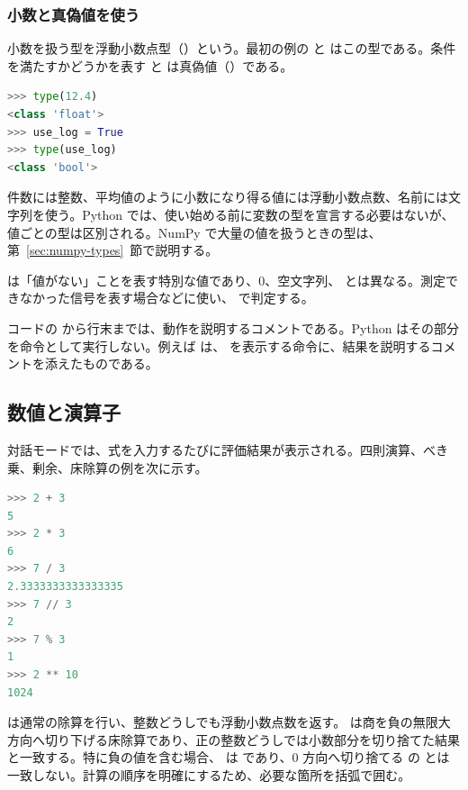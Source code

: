 \subsubsection{小数と真偽値を使う}

小数を扱う型を浮動小数点型（）という。最初の例の  と  はこの型である。条件を満たすかどうかを表す  と  は真偽値（）である。

\begin{lstlisting}[language=Python, numbers=none, xleftmargin=2\zw]
>>> type(12.4)
<class 'float'>
>>> use_log = True
>>> type(use_log)
<class 'bool'>
\end{lstlisting}

件数には整数、平均値のように小数になり得る値には浮動小数点数、名前には文字列を使う。Python では、使い始める前に変数の型を宣言する必要はないが、値ごとの型は区別される。NumPy で大量の値を扱うときの型は、第~\ref{sec:numpy-types}~節で説明する。

 は「値がない」ことを表す特別な値であり、0、空文字列、 とは異なる。測定できなかった信号を表す場合などに使い、 で判定する。

コードの \code{\#} から行末までは、動作を説明するコメントである。Python はその部分を命令として実行しない。例えば  は、 を表示する命令に、結果を説明するコメントを添えたものである。

\subsection{数値と演算子}

対話モードでは、式を入力するたびに評価結果が表示される。四則演算、べき乗、剰余、床除算の例を次に示す。

\begin{lstlisting}[language=Python, numbers=none, xleftmargin=2\zw]
>>> 2 + 3
5
>>> 2 * 3
6
>>> 7 / 3
2.3333333333333335
>>> 7 // 3
2
>>> 7 % 3
1
>>> 2 ** 10
1024
\end{lstlisting}

\code{/} は通常の除算を行い、整数どうしでも浮動小数点数を返す。\code{//} は商を負の無限大方向へ切り下げる床除算であり、正の整数どうしでは小数部分を切り捨てた結果と一致する。特に負の値を含む場合、 は  であり、0 方向へ切り捨てる  の  とは一致しない。計算の順序を明確にするため、必要な箇所を括弧で囲む。


